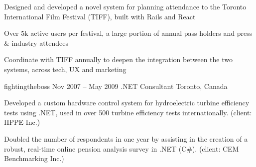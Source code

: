 \documentclass[10pt]{article}
\begin{document}
{{\begin{newitemize}
		\item {Designed and developed a novel system for planning attendance to the Toronto International Film Festival (TIFF), built with Rails and React}
		\item {Over 5k active users per festival, a large portion of annual pass holders and press \& industry attendees}
		\item {Coordinate with TIFF annually to deepen the integration between the two systems, across tech, UX and marketing}
		\end{newitemize}}
	\job
	{fightingtheboss}
	{Nov 2007 – May 2009}
	{.NET Consultant}
	{Toronto, Canada}
	{\begin{newitemize}
		\item {Developed a custom hardware control system for hydroelectric turbine efficiency tests using .NET, used in over 500 turbine efficiency tests internationally. (client: HPPE Inc.)}
		\item {Doubled the number of respondents in one year by assisting in the creation of a robust, real-time online pension analysis survey in .NET (C\#). (client: CEM Benchmarking Inc.)}
		\end{newitemize}}
}



\
\end{document}

